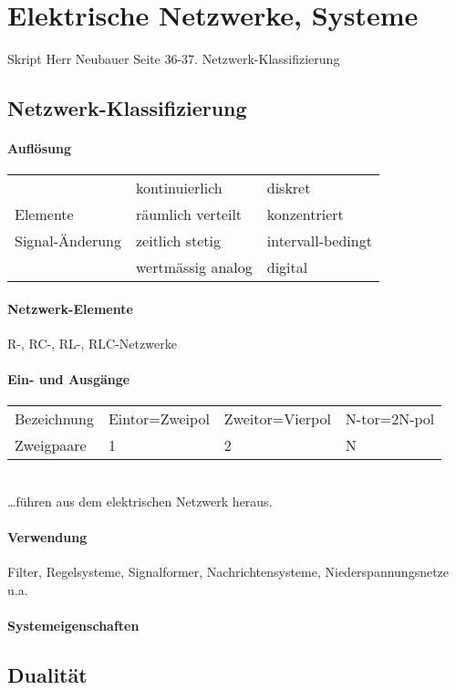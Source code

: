 \section{Elektrische Netzwerke, Systeme}
Skript Herr Neubauer Seite 36-37.
Netzwerk-Klassifizierung


\subsection{Netzwerk-Klassifizierung}
\paragraph{Auflösung}
\begin{tabular}{lll}
& kontinuierlich & diskret \\
Elemente & räumlich verteilt & konzentriert \\
Signal-Änderung & zeitlich stetig & intervall-bedingt\\
& wertmässig analog & digital\\
\end{tabular}
\paragraph{Netzwerk-Elemente}
R-, RC-, RL-, RLC-Netzwerke
\paragraph{Ein- und Ausgänge}
\begin{tabular}{llll}
Bezeichnung & Eintor=Zweipol & Zweitor=Vierpol & N-tor=2N-pol \\
Zweigpaare & 1 & 2 & N\\
\end{tabular}\\
\ldots führen aus dem elektrischen Netzwerk heraus.
\paragraph{Verwendung}
Filter, Regelsysteme, Signalformer, Nachrichtensysteme, Niederspannungsnetze
u.a.
\paragraph{Systemeigenschaften}

\subsection{Dualität}
